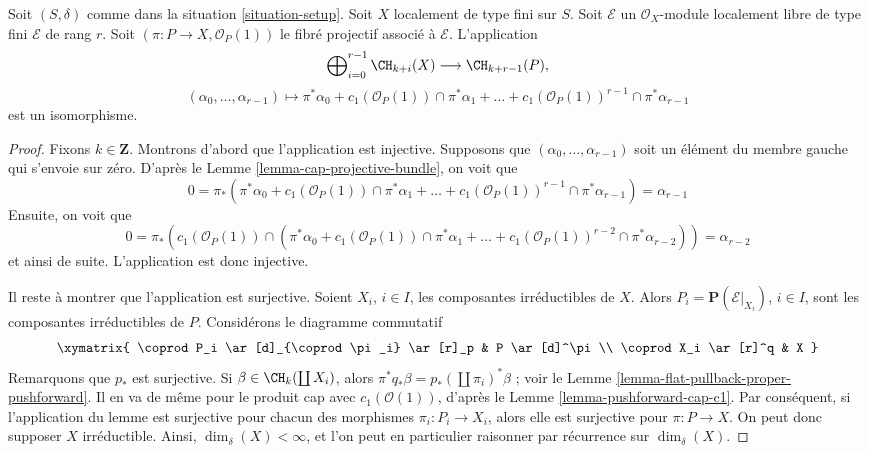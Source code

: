 \begin{lemma}
\label{lemma-chow-ring-projective-bundle}
Soit $(S, \delta)$ comme dans la situation \ref{situation-setup}.
Soit $X$ localement de type fini sur $S$.
Soit $\mathcal{E}$ un $\mathcal{O}_X$-module localement libre de type fini
$\mathcal{E}$ de rang $r$. Soit $(\pi : P \to X, \mathcal{O}_P(1))$
le fibré projectif associé à $\mathcal{E}$.
L'application
$$
\bigoplus\nolimits_{i = 0}^{r - 1}
\CH_{k + i}(X)
\longrightarrow
\CH_{k + r - 1}(P),
$$
$$
(\alpha_0, \ldots, \alpha_{r-1})
\longmapsto
\pi^*\alpha_0 +
c_1(\mathcal{O}_P(1)) \cap \pi^*\alpha_1
+ \ldots +
c_1(\mathcal{O}_P(1))^{r - 1} \cap \pi^*\alpha_{r-1}
$$
est un isomorphisme.
\end{lemma}

\begin{proof}
Fixons $k \in \mathbf{Z}$. Montrons d'abord que l'application est injective.
Supposons que $(\alpha_0, \ldots, \alpha_{r - 1})$ soit un élément
du membre gauche qui s'envoie sur zéro.
D'après le Lemme \ref{lemma-cap-projective-bundle}, on voit que
$$
0 = \pi_*(\pi^*\alpha_0 +
c_1(\mathcal{O}_P(1)) \cap \pi^*\alpha_1
+ \ldots +
c_1(\mathcal{O}_P(1))^{r - 1} \cap \pi^*\alpha_{r-1})
= \alpha_{r - 1}
$$
Ensuite, on voit que
$$
0 = \pi_*(c_1(\mathcal{O}_P(1)) \cap (\pi^*\alpha_0 +
c_1(\mathcal{O}_P(1)) \cap \pi^*\alpha_1
+ \ldots +
c_1(\mathcal{O}_P(1))^{r - 2} \cap \pi^*\alpha_{r - 2}))
= \alpha_{r - 2}
$$
et ainsi de suite. L'application est donc injective.

\medskip\noindent
Il reste à montrer que l'application est surjective.
Soient $X_i$, $i \in I$, les composantes irréductibles de $X$.
Alors $P_i = \mathbf{P}(\mathcal{E}|_{X_i})$, $i \in I$,
sont les composantes irréductibles de $P$. Considérons le
diagramme commutatif
$$
\xymatrix{
\coprod P_i \ar[d]_{\coprod \pi_i} \ar[r]_p & P \ar[d]^\pi \\
\coprod X_i \ar[r]^q & X
}
$$
Remarquons que $p_*$ est surjective. Si $\beta \in \CH_k(\coprod X_i)$,
alors $\pi^* q_* \beta = p_*(\coprod \pi_i)^* \beta$ ; voir le
Lemme \ref{lemma-flat-pullback-proper-pushforward}. Il en va de même pour
le produit cap avec $c_1(\mathcal{O}(1))$, d'après le
Lemme \ref{lemma-pushforward-cap-c1}.
Par conséquent, si l'application du lemme est surjective pour chacun
des morphismes $\pi_i : P_i \to X_i$, alors elle est
surjective pour $\pi : P \to X$. On peut donc supposer $X$ irréductible.
Ainsi, $\dim_\delta(X) < \infty$, et l'on peut en particulier raisonner
par récurrence sur $\dim_\delta(X)$.


\end{proof}
